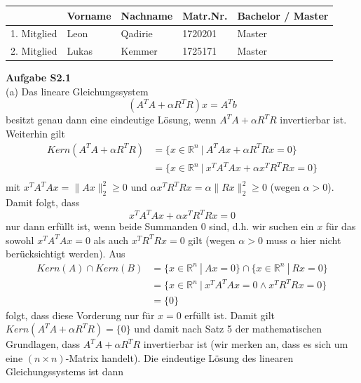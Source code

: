 \documentclass[ngerman, a4paper,12pt]{article}
\begin{document}
\begin{table}[h]
	\centering
	\begin{tabularx}{\textwidth}{X X X X X}
		 & Vorname & Nachname & Matr.Nr. & Bachelor / Master \\
		\toprule
		1. Mitglied & Leon & Qadirie & 1720201 &  Master\\
		2. Mitglied & Lukas & Kemmer & 1725171 &  Master\\
		\bottomrule
	\end{tabularx}
\end{table}
\textbf{Aufgabe S2.1} \\
(a) Das lineare Gleichungssystem
\begin{equation}
  (A^TA+\alpha R^TR)x=A^Tb
\end{equation}
besitzt genau dann eine eindeutige Lösung, wenn $A^TA+\alpha R^TR$ invertierbar ist. Weiterhin gilt
\begin{equation*}
	\begin{split}
		Kern(A^TA + \alpha R^T R) &= \{x \in \mathbb{R}^n \ | \ A^TAx + \alpha R^TRx = 0 \} \\
	&=\{x \in \mathbb{R}^n \ | \ x^TA^TAx + \alpha x^TR^TRx = 0 \} \\
	\end{split}
\end{equation*}
mit $x^TA^TAx = \| Ax \| _2^2 \geq 0$ und $\alpha x^TR^TRx = \alpha \| Rx \|_2^2 \geq 0$ (wegen $\alpha >0$). Damit folgt, dass 
\begin{equation}
	x^TA^TAx + \alpha x^TR^TRx = 0
\end{equation}
nur dann erfüllt ist, wenn beide Summanden $0$ sind, d.h. wir suchen ein $x$ für das sowohl $x^TA^TAx=0$ als auch $x^TR^TRx=0$ gilt (wegen $\alpha>0$ muss $\alpha$ hier nicht berücksichtigt werden). Aus
\begin{equation*}
	\begin{split}
		Kern(A) \cap Kern(B) &= \{x \in \mathbb{R}^n \ | \ Ax=0 \} \cap \{x \in \mathbb{R}^n \ | \ Rx=0 \} \\
		&=\{x \in \mathbb{R}^n \ | \ x^TA^TAx=0 \land x^TR^TRx=0 \} \\
		&=\{0\}
	\end{split}
\end{equation*}
folgt, dass diese Vorderung nur für $x=0$ erfüllt ist. Damit gilt $Kern(A^TA + \alpha R^TR) = \{0\}$ und damit nach Satz 5 der mathematischen Grundlagen, dass $A^TA + \alpha R^TR$ invertierbar ist (wir merken an, dass es sich um eine $(n \times n)$-Matrix handelt). Die eindeutige Lösung des linearen Gleichungssystems ist dann
\end{document}
